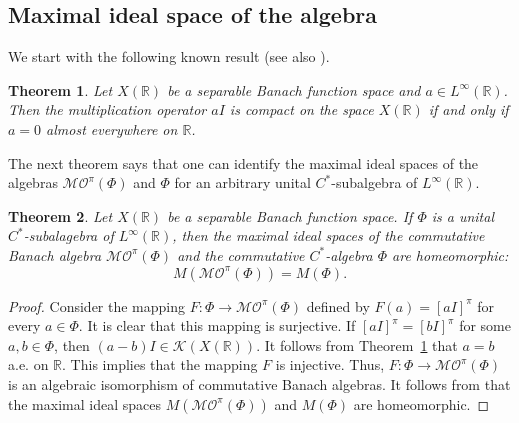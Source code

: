 \documentclass{birkjour}
\newtheorem{theorem}{Theorem}[section]
\numberwithin{equation}{section}
\newcommand{\R}{\mathbb{R}}
\newcommand{\cK}{\mathcal{K}}
\begin{document}
\subsection{Maximal ideal space of the algebra
}
We start with the following known result \cite[Theorem~2.4]{HKK06}
(see also \cite[Theorem~3.1]{FKK-FS12}).
\begin{theorem}\label{th:noncompactness-multiplication}
Let $X(\R)$ be a separable Banach function space and $a\in L^\infty(\R)$. Then
the  multiplication operator $aI$ is compact on the space $X(\R)$ if and only
if $a=0$ almost everywhere on $\R$.
\end{theorem}
The next theorem says that one can identify the maximal ideal spaces
of the algebras $\mathcal{MO}^\pi(\Phi)$ and $\Phi$ for an arbitrary
unital $C^*$-subalgebra of $L^\infty(\R)$.
\begin{theorem}\label{th:maximal-ideal-space-quotient-algebra-MO}
Let $X(\R)$ be a separable Banach function space.
If $\Phi$ is a unital $C^*$-subalagebra of $L^\infty(\R)$, then
the maximal ideal spaces of the commutative Banach algebra
$\mathcal{MO}^\pi(\Phi)$ and the commutative $C^*$-algebra $\Phi$
are homeomorphic:
\[
M(\mathcal{MO}^\pi(\Phi))=M(\Phi).
\]
\end{theorem}
\begin{proof}
Consider the mapping $F:\Phi\to\mathcal{MO}^\pi(\Phi)$ defined
by $F(a)=[aI]^\pi$
for every $a\in\Phi$. It is clear that this mapping is surjective. If
$[aI]^\pi=[bI]^\pi$ for some $a,b\in\Phi$, then
$(a-b)I\in\cK(X(\R))$. It follows from
Theorem~\ref{th:noncompactness-multiplication} that $a=b$ a.e. on $\R$.
This implies that the mapping $F$ is injective. Thus,
$F:\Phi\to\mathcal{MO}^\pi(\Phi)$
is an algebraic isomorphism of commutative Banach algebras. It follows from
\cite[Lemma~2.2.12]{K09} that the maximal ideal spaces
$M(\mathcal{MO}^\pi(\Phi))$ and $M(\Phi)$ are homeomorphic.
\end{proof}
\end{document}
